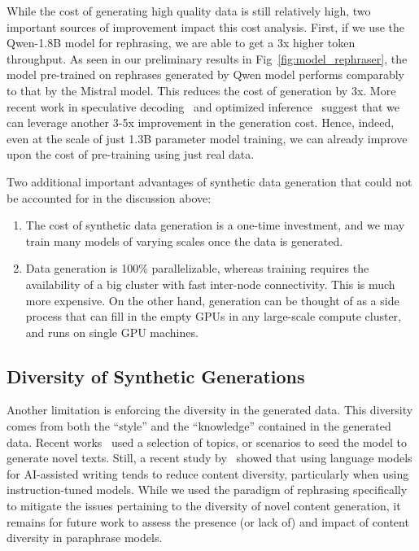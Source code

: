 While the cost of generating high quality data is still relatively high, two important sources of improvement impact this cost analysis.  First, if we use the Qwen-1.8B model \cite{bai2023qwen} for rephrasing, we are able to get a 3x higher token throughput. As seen in our preliminary results in Fig~\ref{fig:model_rephraser}, the model pre-trained on rephrases generated by Qwen model performs comparably to that by the Mistral model. This reduces the cost of generation by 3x. More recent work in speculative decoding~\citep{liu2023online} and optimized inference~\citep{xia2024unlocking} suggest that we can leverage another 3-5x improvement in the generation cost. Hence, indeed, even at the scale of just 1.3B parameter model training, we can already improve upon the cost of pre-training using just real data.

Two additional important advantages of synthetic data generation that could not be accounted for in the discussion above:
\begin{enumerate}
    \item The cost of synthetic data generation is a one-time investment, and we may train many models of varying scales once the data is generated.
    \item Data generation is 100\% parallelizable, whereas training requires the availability of a big cluster with fast inter-node connectivity. This is much more expensive. On the other hand, generation can be thought of as a side process that can fill in the empty GPUs in any large-scale compute cluster, and runs on single GPU machines.
\end{enumerate}

\subsection{Diversity of Synthetic Generations}
Another limitation is enforcing the diversity in the generated data. This diversity comes from both the ``style'' and the ``knowledge'' contained in the generated data. Recent works~\citep{li2023self,li2023textbooks} used a selection of topics, or scenarios to seed the model to generate novel texts.  Still, a recent study by~\citet{padmakumar-etal-2023-investigating} showed that using language models for AI-assisted writing tends to reduce content diversity, particularly when using instruction-tuned models. While we used the paradigm of rephrasing specifically to mitigate the issues pertaining to the diversity of novel content generation, it remains for future work to assess the presence (or lack of) and impact of content diversity in paraphrase models.


